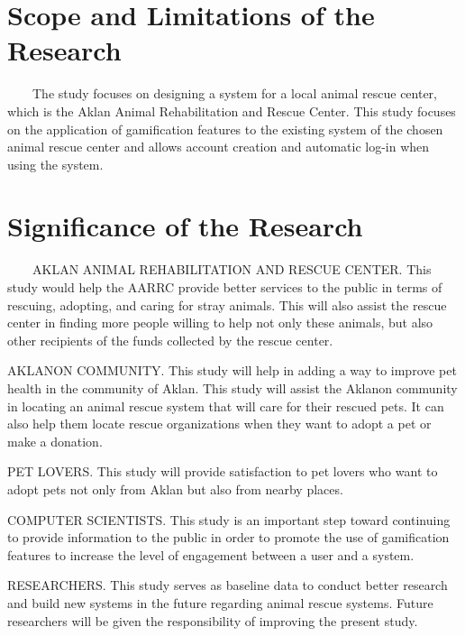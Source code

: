 \section{Scope and Limitations of the Research}
\label{sec:scopelimitations}

~~~~The study focuses on designing a system for a local animal rescue center, which is the Aklan Animal Rehabilitation and Rescue Center. This study focuses on the application of gamification features to the existing system of the chosen animal rescue center and allows account creation and automatic log-in when using the system.

\begin{comment}

%
%
Generally, one paragraph should be allotted for each of your research objectives.

Each paragraph contains a brief overview of the concept/theory and the purpose of doing the associated objective.

Each paragraph also includes a description of the scope/limitation of your study.

* Please refer to the slides for examples.

\end{comment}


\section{Significance of the Research}
\label{sec:significance}

~~~~AKLAN ANIMAL REHABILITATION AND RESCUE CENTER. This study would help the AARRC provide better services to the public in terms of rescuing, adopting, and caring for stray animals. This will also assist the rescue center in finding more people willing to help not only these animals, but also other recipients of the funds collected by the rescue center.

AKLANON COMMUNITY. This study will help in adding a way to improve pet health in the community of Aklan. This study will assist the Aklanon community in locating an animal rescue system that will care for their rescued pets. It can also help them locate rescue organizations when they want to adopt a pet or make a donation.

PET LOVERS. This study will provide satisfaction to pet lovers who want to adopt pets not only from Aklan but also from nearby places.

COMPUTER SCIENTISTS. This study is an important step toward continuing to provide information to the public in order to promote the use of gamification features to increase the level of engagement between a user and a system.

RESEARCHERS. This study serves as baseline data to conduct better research and build new systems in the future regarding animal rescue systems. Future researchers will be given the responsibility of improving the present study.



%
%


